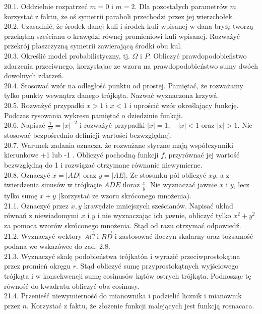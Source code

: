 \documentclass[10pt]{article}
\begin{document}
20.1. Oddzielnie rozpatrzeć $m=0$ i $m=2$. Dla pozostałych parametrów $m$ korzystać z faktu, że oś symetrii paraboli przechodzi przez jej wierzchołek.\\
20.2. Uzasadnić, że środek danej kuli i środek kuli wpisanej w dana bryłę tworzą przekątną sześcianu o krawędzi równej promieniowi kuli wpisanej. Rozważyć przekrój płaszczyzną symetrii zawierającą środki obu kul.\\
20.3. Określić model probabilistyczny, tj. $\Omega$ i $P$. Obliczyć prawdopodobieństwo zdarzenia przeciwnego, korzystajac ze wzoru na prawdopodobieństwo sumy dwóch dowolnych zdarzeń.\\
20.4. Stosować wzór na odległość punktu od prostej. Pamiętać, że rozważamy tylko punkty wewnątrz danego trójkąta. Nazwać wyznaczona krzywá.\\
20.5. Rozważyć przypadki $x>1$ i $x<1$ i uprościć wzór określający funkcję. Podczas rysowania wykresu pamiętać o dziedzinie funkcji.\\
20.6. Napisać $\frac{1}{x^{2}}=|x|^{-2}$ i rozważyć przypadki $|x|=1, \quad|x|<1$ oraz $|x|>1$. Nie stosować bezpośrednio definicji wartości bezwzględnej.\\
20.7. Warunek zadania oznacza, że rozważane styczne mają współczynniki kierunkowe +1 lub -1 . Obliczyć pochodną funkcji $f$, przyrównać jej wartość bezwzględną do 1 i rozwiązać otrzymane równanie niewymierne.\\
20.8. Oznaczyć $x=|A D|$ oraz $y=|A E|$. Ze stosunku pól obliczyć $x y$, a z twierdzenia sinusów w trójkaçie $A D E$ iloraz $\frac{x}{y}$. Nie wyznaczać jawnie $x$ i $y$, lecz tylko sumę $x+y$ (korzystać ze wzoru skróconego mnożenia).\\
21.1. Oznaczyć przez $x, y$ krawędzie mniejszych sześcianów. Napisać układ równań z niewiadomymi $x$ i $y$ i nie wyznaczając ich jawnie, obliczyć tylko $x^{2}+y^{2}$ za pomoca wzorów skróconego mnożenia. Stąd od razu otrzymać odpowiedź.\\
21.2. Wyznaczyć wektory $\overrightarrow{A C}$ i $\overrightarrow{B D}$ i zastosować iloczyn skalarny oraz tożsamość podana we wskazówce do zad. 2.8.\\
21.3. Wyznaczyć skalę podobieństwa trójkatón i wyrazić przeciwprostokątna przez promień okręgu $r$. Stąd obliczyć sumę przyprostokątnych wyjściowego trójkąta i w konsekwencji sumę cosinusów kątów ostrych trójkąta. Podnosząc tę równość do kwadratu obliczyć oba cosinusy.\\
21.4. Przenieść niewymierność do mianownika i podzielić licznik i mianownik przez $n$. Korzystać z faktu, że złożenie funkcji malejących jest funkcją rosnacaca.\\
\end{document}
